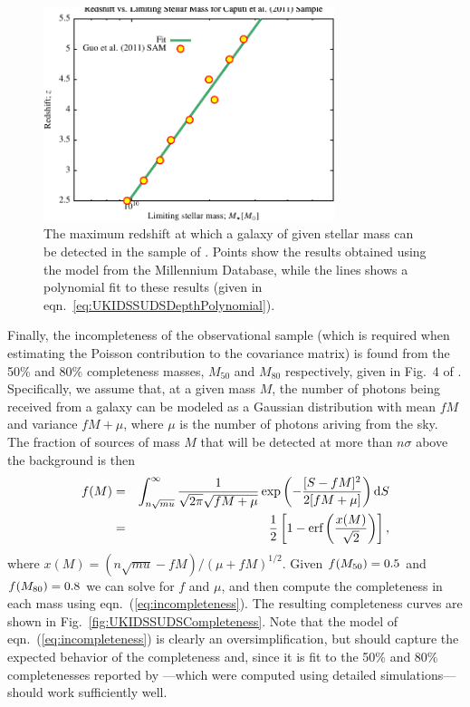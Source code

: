 \begin{figure}
 \begin{center}
 \includegraphics[width=85mm,trim=0mm 0mm 0mm 4mm,clip]{Plots/DataAnalysis/UKIDSSUDSMassLuminosityRelation.pdf}
 \caption{The maximum redshift at which a galaxy of given stellar mass can be detected in the sample of \protect\cite{caputi_stellar_2011}. Points show the results obtained using the \protect\cite{henriques_confronting_2012} model from the Millennium Database, while the lines shows a polynomial fit to these results (given in eqn.~\ref{eq:UKIDSSUDSDepthPolynomial}).}
 \end{center}
 \label{fig:UKIDSSUDSMassRedshift}
\end{figure}

Finally, the incompleteness of the observational sample (which is required when estimating the Poisson contribution to the covariance matrix) is found from the 50\% and 80\% completeness masses, $M_{50}$ and $M_{80}$ respectively, given in Fig.~4 of \cite{caputi_stellar_2011}. Specifically, we assume that, at a given mass $M$, the number of photons being received from a galaxy can be modeled as a Gaussian distribution with mean $f M$ and variance $fM+\mu$, where $\mu$ is the number of photons ariving from the sky. The fraction of sources of mass $M$ that will be detected at more than $n \sigma$ above the background is then
\begin{eqnarray}
f(M) & = & \int_{n\sqrt{mu}}^\infty {1 \over \sqrt{2 \pi} \sqrt{f M + \mu}} \exp\left( - {[S-fM]^2 \over 2 [f M + \mu]} \right) {\rm d}S \nonumber \\
     & = & {1 \over 2}\left[ 1 - \hbox{erf}\left( {x(M) \over \sqrt{2}} \right)  \right],
\label{eq:incompleteness}
\end{eqnarray}
where $x(M) = (n \sqrt{mu} - f M)/(\mu+fM)^{1/2}$. Given $f(M_{\rm 50})=0.5$ and $f(M_{\rm 80})=0.8$ we can solve for $f$ and $\mu$, and then compute the completeness in each mass using eqn.~(\ref{eq:incompleteness}). The resulting completeness curves are shown in Fig.~\ref{fig:UKIDSSUDSCompleteness}. Note that the model of eqn.~(\ref{eq:incompleteness}) is clearly an oversimplification, but should capture the expected behavior of the completeness and, since it is fit to the 50\% and 80\% completenesses reported by \cite{caputi_stellar_2011}---which were computed using detailed simulations---should work sufficiently well.

